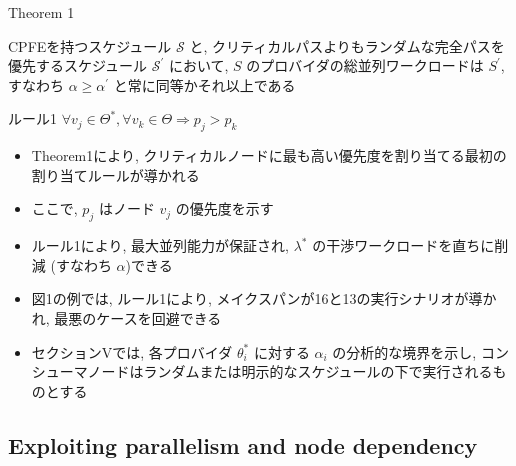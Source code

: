 \begin{frame}[label=theorem1]{Theorem 1}
    \begin{theorem}[]
        CPFEを持つスケジュール $\mathcal{S}$ と, クリティカルパスよりもランダムな完全パスを優先するスケジュール $\mathcal{S}^{\prime}$ において, $S$ のプロバイダの総並列ワークロードは $S^{\prime}$, すなわち $\alpha \geq \alpha^{\prime}$ と常に同等かそれ以上である
    \end{theorem}
\end{frame}

\begin{frame}{ルール1}
    $\forall v_{j} \in \Theta^{*}, \forall v_{k} \in \Theta \Rightarrow p_{j}>p_{k}$
\end{frame}

\begin{frame}{}
    \begin{itemize}
        \item Theorem1により, クリティカルノードに最も高い優先度を割り当てる最初の割り当てルールが導かれる
        \item ここで, $p_{j}$ はノード $v_{j}$ の優先度を示す
        \item ルール1により, 最大並列能力が保証され, $\lambda^{*}$ の干渉ワークロードを直ちに削減 (すなわち $\alpha$)できる
        \item 図1の例では, ルール1により, メイクスパンが16と13の実行シナリオが導かれ, 最悪のケースを回避できる
        \item セクションVでは, 各プロバイダ $\theta_{i}^{*}$ に対する $\alpha_{i}$ の分析的な境界を示し, コンシューマノードはランダムまたは明示的なスケジュールの下で実行されるものとする
    \end{itemize}
\end{frame}


\subsection{Exploiting parallelism and node dependency}
\label{ssec: Exploiting parallelism and node dependency}

